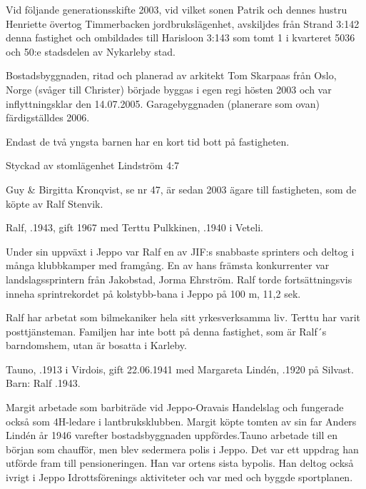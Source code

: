 Vid följande generationsskifte 2003, vid vilket sonen Patrik och dennes hustru Henriette övertog Timmerbacken jordbrukslägenhet, avskiljdes från Strand 3:142 denna fastighet och ombildades till	Harisloon 3:143 som tomt 1 i kvarteret 5036 och 50:e stadsdelen av	Nykarleby stad.

Bostadsbyggnaden, ritad och planerad av arkitekt Tom Skarpaas	från Oslo, Norge (svåger till Christer) började byggas i egen regi hösten 2003 och var inflyttningsklar den 14.07.2005. Garagebyggnaden (planerare som ovan) färdigställdes 2006.

Endast de två yngsta barnen har en kort tid bott på fastigheten.


Styckad av stomlägenhet Lindström 4:7


Guy \& Birgitta Kronqvist, se nr 47, är sedan 2003 ägare till fastigheten, som de köpte av Ralf Stenvik.


Ralf, .1943, gift 1967 med Terttu Pulkkinen, .1940 i Veteli.
\begin{jhchildren}
  \item {}
  \item {}
\end{jhchildren}
Under sin uppväxt i Jeppo var Ralf en av JIF:s snabbaste sprinters och deltog i många klubbkamper med framgång. En av hans främsta konkurrenter var landslagssprintern från Jakobstad, Jorma Ehrström. Ralf torde fortsättningsvis inneha sprintrekordet på kolstybb-bana i Jeppo på 100 m, 11,2 sek.

Ralf har arbetat som bilmekaniker hela sitt yrkesverksamma liv. Terttu har varit posttjänsteman. Familjen har inte bott på denna fastighet, som är Ralf´s barndomshem, utan är bosatta i Karleby.


Tauno, .1913 i Virdois, gift 22.06.1941 med  Margareta Lindén, .1920 på Silvast.
Barn: Ralf .1943.

Margit arbetade som barbiträde vid Jeppo-Oravais Handelslag och fungerade också som 4H-ledare i lantbruksklubben. Margit köpte tomten av sin far Anders Lindén år 1946 varefter bostadsbyggnaden uppfördes.Tauno arbetade till en början som chaufför, men blev sedermera polis i Jeppo. Det var ett uppdrag han utförde fram till pensioneringen. Han var ortens sista bypolis. Han deltog också ivrigt i Jeppo  Idrottsförenings aktiviteter och var med och byggde sportplanen.

